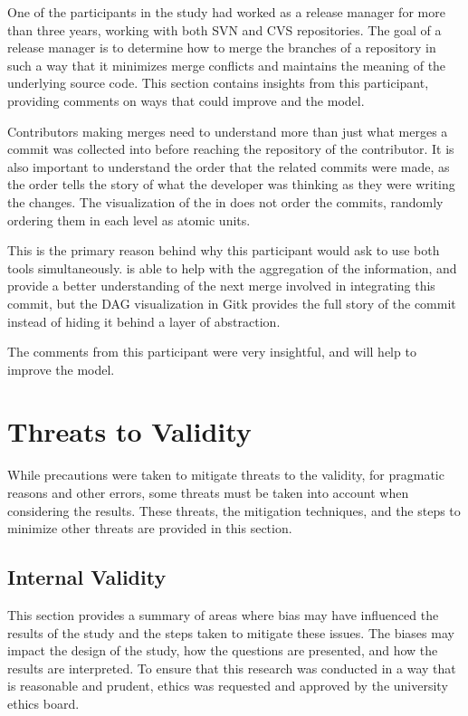 One of the participants in the study had worked as a release manager for
more than three years, working with both SVN and CVS repositories. The
goal of a release manager is to determine how to merge the branches of a
repository in such a way that it minimizes merge conflicts and maintains
the meaning of the underlying source code. This section contains
insights from this participant, providing comments on ways that could
improve \tool{} and the \mt{} model.

Contributors making merges need to understand more than just what merges
a commit was collected into before reaching the repository of the
contributor.
It is also important to understand the order that the
related commits were made, as the order tells the story of what the
developer was thinking as they were writing the changes.
The visualization of the \mt{} in \tool{} does not order the commits,
randomly ordering them in each level as atomic units.

This is the primary reason behind why this participant would ask to use
both tools simultaneously. \tool{} is able to help with the aggregation
of the information, and provide a better understanding of the next merge
involved in integrating this commit, but the DAG visualization in Gitk
provides the full story of the commit instead of hiding it behind a
layer of abstraction.

The comments from this participant were very insightful, and will help
to improve the \mt{} model.

\section{Threats to Validity}\label{sec:threats_to_validity}

While precautions were taken to mitigate threats to the validity, for
pragmatic reasons and other errors, some threats must be taken into
account when considering the results. These threats, the mitigation
techniques, and the steps to minimize other threats are provided in this
section.

\subsection{Internal Validity}\label{sub:internal_validity}

This section provides a summary of areas where bias may have influenced
the results of the study and the steps taken to mitigate these issues.
The biases may impact the design of the study, how the questions are
presented, and how the results are interpreted.
To ensure that this research was conducted in a way that is reasonable
and prudent, ethics was requested and approved by the university ethics
board.

